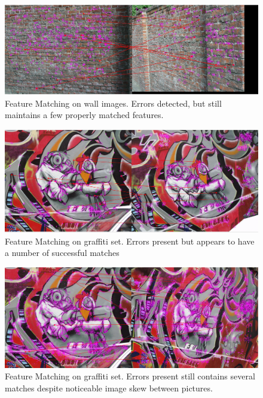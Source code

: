 \documentclass[12pt,journal,compsoc]{IEEEtran}
\begin{document}
\begin{figure}[h]
	\centering
		  \centering
		  \includegraphics[width=1\linewidth]{img/wall3}
		  \caption{Feature Matching on wall images. Errors detected, but still maintains a few properly matched features.}
		  \label{fig:wall3}
\end{figure}


\begin{figure}[h]
	\centering
		  \centering
		  \includegraphics[width=1\linewidth]{img/graf1}
		  \caption{Feature Matching on graffiti set. Errors present but appears to have a number of successful matches}
		  \label{fig:graf1}
\end{figure}

\begin{figure}[h]
	\centering
		  \centering
		  \includegraphics[width=1\linewidth]{img/graf2}
\caption{Feature Matching on graffiti set. Errors present still contains several matches despite noticeable image skew between pictures.}
		  \label{fig:graf2}
\end{figure}
\end{document}
